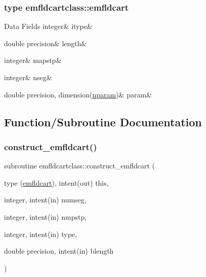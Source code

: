 \subsubsection{type emfldcartclass\+::emfldcart}
\begin{DoxyFields}{Data Fields}
\mbox{\label{namespaceemfldcartclass_a9ea1ffbf61d29a3520ad743300cfce15}} 
integer&
itype&
\\
\hline

\mbox{\label{namespaceemfldcartclass_aa2c152d23138df1a44c6ff50407ac04d}} 
double precision&
length&
\\
\hline

\mbox{\label{namespaceemfldcartclass_af80bf92550bb63b5f809ab3be6bbfe8d}} 
integer&
mapstp&
\\
\hline

\mbox{\label{namespaceemfldcartclass_acf5b75cb340cfc6f837318ed47038f25}} 
integer&
nseg&
\\
\hline

\mbox{\label{namespaceemfldcartclass_a72ab84a2cacd1906ab51cb7a6637956e}} 
double precision, dimension(\mbox{\hyperlink{namespaceemfldcartclass_a72ee7da1adbf56a707b72607da000549}{nparam}})&
param&
\\
\hline

\end{DoxyFields}


\subsection{Function/\+Subroutine Documentation}
\mbox{\label{namespaceemfldcartclass_a22c8117844df69d19834c91595060930}} 
\subsubsection{\texorpdfstring{construct\_emfldcart()}{construct\_emfldcart()}}
{\footnotesize\ttfamily subroutine emfldcartclass\+::construct\+\_\+emfldcart (\begin{DoxyParamCaption}\item[{type (\mbox{\hyperlink{namespaceemfldcartclass_structemfldcartclass_1_1emfldcart}{emfldcart}}), intent(out)}]{this,  }\item[{integer, intent(in)}]{numseg,  }\item[{integer, intent(in)}]{nmpstp,  }\item[{integer, intent(in)}]{type,  }\item[{double precision, intent(in)}]{blength }\end{DoxyParamCaption})}

